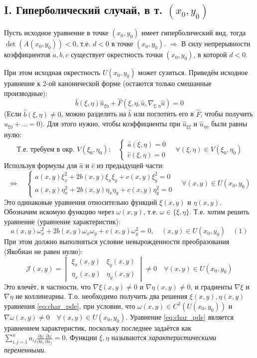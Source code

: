 \documentclass[12pt, a4paper]{article}
\begin{document}
\subsection*{I. Гиперболический случай, в т. $(x_0, y_0)$}
Пусть исходное уравнение в точке $(x_0, y_0)$ имеет гиперболический вид, тогда $\det(A(x_0, y_0)) < 0$, т.е. $d < 0$ в точке $(x_0, y_0)$.
$\Rightarrow$ В силу непрерывности коэффициентов $a, b, c$ существует окрестность точки $(x_0, y_0)$, в которой $d < 0$.


При этом исходная окрестность $U(x_0, y_0)$ может сузиться. Приведём исходное уравнение к 2-ой канонической форме (остаются только смешанные производные):
\[
\hat{b}(\xi,\eta) \hat{u}_{\xi\eta} + \hat{F}(\xi, \eta, \hat{u}, \nabla_{\xi,\eta} \hat{u}) = 0
\]
(Если $\hat{b}(\xi,\eta) \neq 0$, можно разделить на $\hat{b}$ или поглотить его в $\hat{F}$, чтобы получить $\hat{u}_{\xi\eta} + \dots = 0$).
Для этого нужно, чтобы коэффициенты при $\hat{u}_{\xi\xi}$ и $\hat{u}_{\eta\eta}$ были равны нулю:
\[
\text{Т.е. требуем в окр. } V(\xi_0, \eta_0): \quad
\begin{cases}
\hat{a}(\xi,\eta) = 0 \\
\hat{c}(\xi,\eta) = 0
\end{cases}
\quad \forall (\xi,\eta) \in V(\xi_0, \eta_0)
\]
Используя формулы для $\hat{a}$ и $\hat{c}$ из предыдущей части:
\[
\Leftrightarrow \quad
\begin{cases}
a(x,y)\xi_x^2 + 2b(x,y)\xi_x\xi_y + c(x,y)\xi_y^2 = 0 \\
a(x,y)\eta_x^2 + 2b(x,y)\eta_x\eta_y + c(x,y)\eta_y^2 = 0
\end{cases}
\quad \forall (x,y) \in U(x_0, y_0)
\]
Это одинаковые уравнения относительно функций $\xi(x,y)$ и $\eta(x,y)$. Обозначим искомую функцию через $\omega(x,y)$, т.е. $\omega \in \{\xi, \eta\}$.
Т.е. хотим решить уравнение (уравнение характеристик):
\begin{equation} \label{eq:char_pde}
a(x,y)\omega_x^2 + 2b(x,y)\omega_x\omega_y + c(x,y)\omega_y^2 = 0, \quad (x,y) \in U(x_0, y_0) \quad (1)
\end{equation}
При этом должно выполняться условие невырожденности преобразования (Якобиан не равен нулю):
\[
\mathcal{J}(x,y) = \begin{vmatrix} \xi_x(x,y) & \xi_y(x,y) \\ \eta_x(x,y) & \eta_y(x,y) \end{vmatrix} \neq 0 \quad \forall (x,y) \in U(x_0, y_0)
\]
Это влечёт, в частности, что $\nabla \xi(x,y) \neq 0$ и $\nabla \eta(x,y) \neq 0$, и градиенты $\nabla \xi$ и $\nabla \eta$ не коллинеарны.
Т.о. необходимо получить два решения $\xi(x,y), \eta(x,y)$ уравнения \eqref{eq:char_pde}, при условии, что $\omega(x,y) \in C^2(U(x_0,y_0))$ и $\nabla \omega(x,y) \neq 0 \quad \forall (x,y) \in U(x_0,y_0)$.
Уравнение \eqref{eq:char_pde} является уравнением характеристик, поскольку последнее задаётся как $\sum_{i,j=1}^n a_{ij} \frac{\partial \omega}{\partial x_i} \frac{\partial \omega}{\partial x_j} = 0$.
Функции $\xi, \eta$ называются \textit{характеристическими переменными}.
\end{document}
